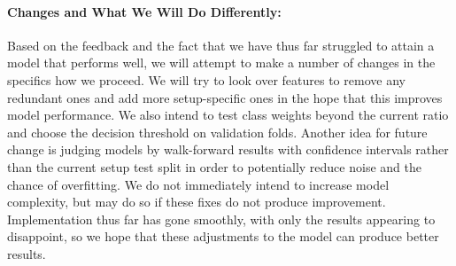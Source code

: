 \documentclass[11pt]{article}
\begin{document}
\paragraph{Changes and What We Will Do Differently:} Based on the feedback and the fact that we have thus far struggled to attain a model that performs well, we will attempt to make a number of changes in the specifics how we proceed. We will try to look over features to remove any redundant ones and add more setup-specific ones in the hope that this improves model performance. We also intend to test class weights beyond the current ratio and choose the decision threshold on validation folds. Another idea for future change is judging models by walk-forward results with confidence intervals rather than the current setup test split in order to potentially reduce noise and the chance of overfitting. We do not immediately intend to increase model complexity, but may do so if these fixes do not produce improvement. Implementation thus far has gone smoothly, with only the results appearing to disappoint, so we hope that these adjustments to the model can produce better results.

%
%
%
%
%
%
%
%
%
%
\end{document}
